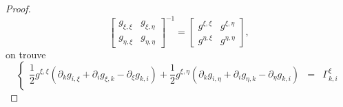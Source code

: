 \begin{proof}
\begin{equation}
\begin{bmatrix}
g_{\xi, \xi} & g_{\xi, \eta} \\ 
g_{\eta, \xi} & g_{\eta, \eta}
\end{bmatrix}^{-1} = 
\begin{bmatrix}
g^{\xi, \xi} & g^{\xi, \eta} \\ 
g^{\eta, \xi} & g^{\eta, \eta}
\end{bmatrix},
\end{equation}
on trouve
\begin{equation}
\left\lbrace
\begin{array}{rcl}
\dfrac{1}{2} g^{\xi, \xi}(\partial_k g_{i, \xi} + \partial_i g_{\xi, k} - \partial_{\xi} g_{k,i} ) + \dfrac{1}{2} g^{\xi, \eta}(\partial_k g_{i, \eta} + \partial_i g_{\eta, k} - \partial_{\eta} g_{k,i} ) & = & \Gamma_{k,i}^{\xi} \\


\end{array}
\end{equation}
\end{proof}
